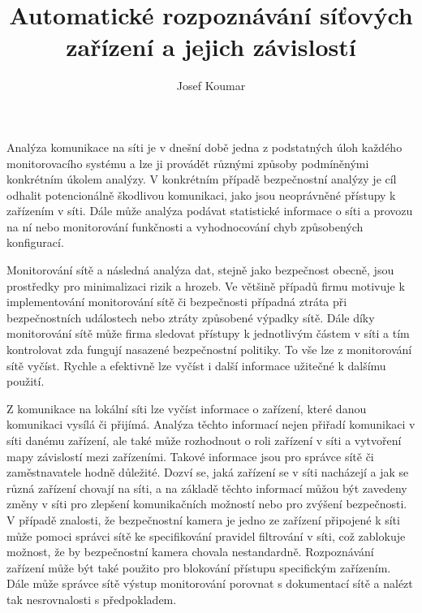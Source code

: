 \documentclass[thesis=B,czech,hidelinks]{FITthesis}[2019/03/21]
\title{Automatické rozpoznávání síťových zařízení a jejich závislostí}
\author{Josef Koumar} %
\begin{document}



\begin{introduction}	%
Analýza komunikace na síti je v dnešní době jedna z podstatných úloh každého monitorovacího systému a lze ji provádět různými způsoby podmíněnými konkrétním úkolem analýzy. V konkrétním případě bezpečnostní analýzy je cíl odhalit potencionálně škodlivou komunikaci, jako jsou neoprávněné přístupy k zařízením v síti. Dále může analýza podávat statistické informace o síti a provozu na ní nebo monitorování funkčnosti a vyhodnocování chyb způsobených konfigurací. 

Monitorování sítě a následná analýza dat, stejně jako bezpečnost obecně, jsou prostředky pro minimalizaci rizik a hrozeb. Ve většině případů firmu motivuje k implementování monitorování sítě či bezpečnosti případná ztráta při bezpečnostních událostech nebo ztráty způsobené výpadky sítě. Dále díky monitorování sítě může firma sledovat přístupy k jednotlivým částem v síti a tím kontrolovat zda fungují nasazené bezpečnostní politiky. To vše lze z monitorování sítě vyčíst. Rychle a efektivně lze vyčíst i další informace užitečné k dalšímu použití. 

Z komunikace na lokální síti lze vyčíst informace o zařízení, které danou komunikaci vysílá či přijímá. Analýza těchto informací nejen přiřadí komunikaci v síti danému zařízení, ale také může rozhodnout o roli zařízení v síti a vytvoření mapy závislostí mezi zařízeními. Takové informace jsou pro správce sítě či zaměstnavatele hodně důležité. Dozví se, jaká zařízení se v síti nacházejí a jak se různá zařízení chovají na síti, a na základě těchto informací můžou být zavedeny změny v síti pro zlepšení komunikačních možností nebo pro zvýšení bezpečnosti. V případě znalosti, že bezpečnostní kamera je jedno ze zařízení připojené k síti může pomoci správci sítě ke specifikování pravidel filtrování v síti, což zablokuje možnost, že by bezpečnostní kamera chovala nestandardně. Rozpoznávání zařízení může být také použito pro blokování přístupu specifickým zařízením. Dále může správce sítě výstup monitorování porovnat s dokumentací sítě a nalézt tak nesrovnalosti s předpokladem.


\end{introduction}
\end{document}

